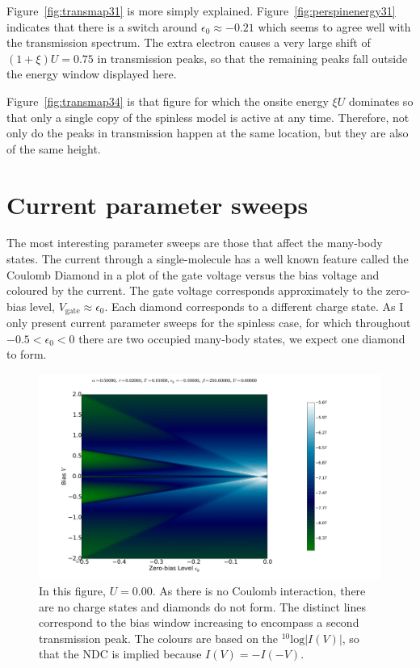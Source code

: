 Figure~\ref{fig:transmap31} is more simply explained. Figure~\ref{fig:perspinenergy31} indicates that there is a switch around $\epsilon_0 \approx -0.21$ which seems to agree well with the transmission spectrum. The extra electron causes a very large shift of $(1+\xi)U = 0.75$ in transmission peaks, so that the remaining peaks fall outside the energy window displayed here.

Figure~\ref{fig:transmap34} is that figure for which the onsite energy $\xi U$ dominates so that only a single copy of the spinless model is active at any time. Therefore, not only do the peaks in transmission happen at the same location, but they are also of the same height.
\section{Current parameter sweeps}
\label{sec:twositeparamsweep}
The most interesting parameter sweeps are those that affect the many-body states. The current through a single-molecule has a well known feature called the Coulomb Diamond \cite{seldenthuis, perrin} in a plot of the gate voltage versus the bias voltage and coloured by the current. The gate voltage corresponds approximately to the zero-bias level, $V_\text{gate} \approx \epsilon_0$. Each diamond corresponds to a different charge state. As I only present current parameter sweeps for the spinless case, for which throughout $-0.5 < \epsilon_0 < 0$ there are two occupied many-body states, we expect one diamond to form.
\begin{figure}[h]
    \centering
    \includegraphics[height=.38\textheight]{pdf/coulombd/current_map_u0.pdf}
    \caption{In this figure, $U=0.00$. As there is no Coulomb interaction, there are no charge states and diamonds do not form. The distinct lines correspond to the bias window increasing to encompass a second transmission peak. The colours are based on the $^{10}\text{log}\left|I(V)\right|$, so that the NDC is implied because $I(V) = -I(-V)$.}
    \label{fig:currentmap0}
\end{figure}
